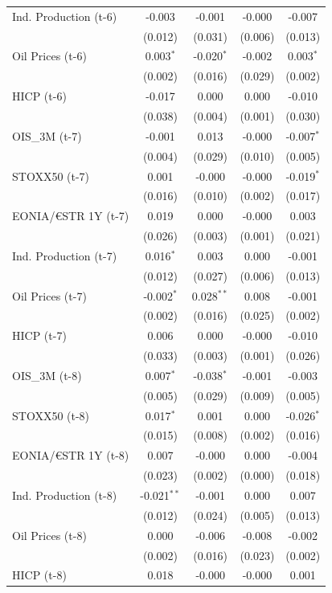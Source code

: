 \begin{longtable}[t]{lcccc}
Ind. Production (t-6) & -0.003 & -0.001 & -0.000 & -0.007\\
 & (0.012) & (0.031) & (0.006) & (0.013)\\
Oil Prices (t-6) & 0.003$^{*}$ & -0.020$^{*}$ & -0.002 & 0.003$^{*}$\\
 & (0.002) & (0.016) & (0.029) & (0.002)\\
HICP (t-6) & -0.017 & 0.000 & 0.000 & -0.010\\
 & (0.038) & (0.004) & (0.001) & (0.030)\\
OIS\_3M (t-7) & -0.001 & 0.013 & -0.000 & -0.007$^{*}$\\
 & (0.004) & (0.029) & (0.010) & (0.005)\\
STOXX50 (t-7) & 0.001 & -0.000 & -0.000 & -0.019$^{*}$\\
 & (0.016) & (0.010) & (0.002) & (0.017)\\
EONIA/€STR 1Y (t-7) & 0.019 & 0.000 & -0.000 & 0.003\\
 & (0.026) & (0.003) & (0.001) & (0.021)\\
Ind. Production (t-7) & 0.016$^{*}$ & 0.003 & 0.000 & -0.001\\
 & (0.012) & (0.027) & (0.006) & (0.013)\\
Oil Prices (t-7) & -0.002$^{*}$ & 0.028$^{**}$ & 0.008 & -0.001\\
 & (0.002) & (0.016) & (0.025) & (0.002)\\
HICP (t-7) & 0.006 & 0.000 & -0.000 & -0.010\\
 & (0.033) & (0.003) & (0.001) & (0.026)\\
OIS\_3M (t-8) & 0.007$^{*}$ & -0.038$^{*}$ & -0.001 & -0.003\\
 & (0.005) & (0.029) & (0.009) & (0.005)\\
STOXX50 (t-8) & 0.017$^{*}$ & 0.001 & 0.000 & -0.026$^{*}$\\
 & (0.015) & (0.008) & (0.002) & (0.016)\\
EONIA/€STR 1Y (t-8) & 0.007 & -0.000 & 0.000 & -0.004\\
 & (0.023) & (0.002) & (0.000) & \vphantom{1} (0.018)\\
Ind. Production (t-8) & -0.021$^{**}$ & -0.001 & 0.000 & 0.007\\
 & (0.012) & (0.024) & (0.005) & (0.013)\\
Oil Prices (t-8) & 0.000 & -0.006 & -0.008 & -0.002\\
 & (0.002) & (0.016) & (0.023) & (0.002)\\
HICP (t-8) & 0.018 & -0.000 & -0.000 & 0.001\\

\end{longtable}
